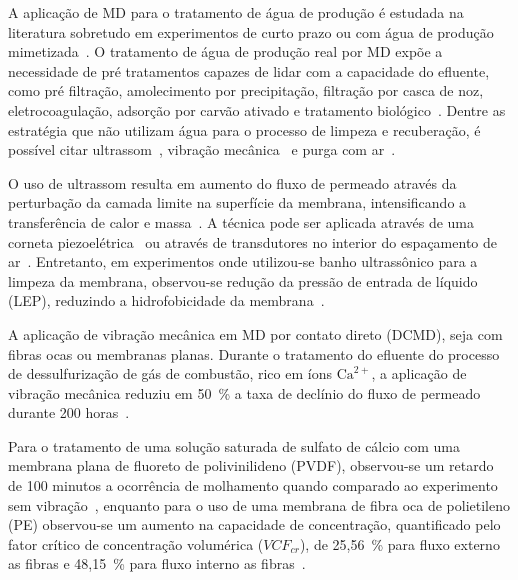 \documentclass[a4paper,12pt]{article}
\begin{document}
A aplicação de MD para o tratamento de água de produção é estudada na literatura sobretudo em experimentos de curto prazo ou com água de produção mimetizada~\cite{Pawar2022LaboratoryPilotScale,Nawaz2021FluxStability}. O tratamento de água de produção real por MD expõe a necessidade de pré tratamentos capazes de lidar com a capacidade do efluente, como pré filtração, amolecimento por precipitação, filtração por casca de noz, eletrocoagulação, adsorção por carvão ativado e tratamento biológico~\cite{Regmi2023ProducedWater,Pawar2022AGMD,Pawar2022,Zhang2019ProducedWater,Fernandez2025ZeroLiquidDischarge,Wang2023ShaleGasWastewater}. Dentre as estratégia que não utilizam água para o processo de limpeza e recuberação, é possível citar ultrassom~\cite{Choi2019PhysicalCleaning}, vibração mecânica~\cite{Lee2025MembraneVibration} e purga com ar~\cite{Horseman2019GasPurging,Warsinger2017ReversingWetting}. 

O uso de ultrassom resulta em aumento do fluxo de permeado através da perturbação da camada limite na superfície da membrana, intensificando a transferência de calor e massa~\cite{Choi2019PhysicalCleaning}. A técnica pode ser aplicada através de uma corneta piezoelétrica~\cite{Zhu1999UltrasonicAGMD} ou através de transdutores no interior do espaçamento de ar~\cite{Naji2020UltrasoundAGMD,Aljuboori2021UltrasonicSpacers}. Entretanto, em experimentos onde utilizou-se banho ultrassônico para a limpeza da membrana, observou-se redução da pressão de entrada de líquido (LEP), reduzindo a hidrofobicidade da membrana~\cite{Choi2019PhysicalCleaning,Bamasag2021UltrasoundSVMD,Cho2019UltrasonicCleaning}.

A aplicação de vibração mecânica em MD por contato direto (DCMD), seja com fibras ocas ou membranas planas. Durante o tratamento do efluente do processo de dessulfurização de gás de combustão, rico em íons $\text{Ca}^{2+}$, a aplicação de vibração mecânica reduziu em 50~\% a taxa de declínio do fluxo de permeado durante 200 horas~\cite{Huang2019MechanicalVibration}. 

Para o tratamento de uma solução saturada de sulfato de cálcio com uma membrana plana de fluoreto de polivinilideno (PVDF), observou-se um retardo de 100 minutos a ocorrência de molhamento quando comparado ao experimento sem vibração~\cite{Lee2025MembraneVibration}, enquanto para o uso de uma membrana de fibra oca de polietileno (PE) observou-se um aumento na capacidade de concentração, quantificado pelo fator crítico de concentração volumérica ($VCF_{cr}$), de 25,56~\% para fluxo externo as fibras e 48,15~\% para fluxo interno as fibras~\cite{ParkVibrationModes}.
\end{document}
